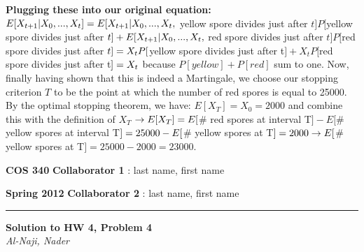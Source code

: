 \documentclass[12pt]{article}
\newcommand{\myheader}[4]
{\vspace*{-0.5in}
\noindent
{#1} \hfill {#3}

\noindent
{#2} \hfill {#4}

\noindent
\rule[8pt]{\textwidth}{1pt}

\vspace{1ex} 
}  %
\newcommand{\myalgsheader}[0]
{\myheader
{ {\bf{COS 340}} }
{ {\bf{Spring 2012}} }
{ {\bf{Collaborator 1}} : last name, first name }
{ {\bf{Collaborator 2}} : last name, first name}
}
\newcommand{\myhwtitle}[3]
{\begin{center}
{\large {\bf Solution to HW {#1}, Problem {#2}}}\\
\medskip 
{\it {#3}} %
\end{center}}
\begin{document}
\newline
\newline
\textbf{Plugging these into our original equation: }
\newline
$E[X_{t+1} | X_0, ..., X_t] 
\newline = E[X_{t+1} | X_0, ..., X_t,$ yellow spore divides just after $t] P[$yellow spore divides just after $t]
\newline + E[X_{t+1} | X_0, ..., X_t,$ red spore divides just after $t] P[$red spore divides just after $t]
\newline
\newline
= X_t P[$yellow spore divides just after t$] + X_t P[$red spore divides just after t$]
\newline
= X_t$ because $P[yellow] + P[red]$ sum to one.
\newline
\newline
Now, finally having shown that this is indeed a Martingale, we choose our stopping criterion $T$ to be the point at which 
the number of red spores is equal to 25000. By the optimal stopping theorem, we have:
\newline
\newline
$E[X_T] = X_0 = 2000$ and combine this with the definition of $X_T$$
\newline
\rightarrow E[X_T] = E[$\# red spores at interval T$] - E[$\# yellow spores at interval T$]
\newline = 25000 - E[$\# yellow spores at T$] = 2000 
\newline \rightarrow E[$\# yellow spores at T$] = 25000 - 2000 = 23000$.


\pagebreak

\myalgsheader

\pagestyle{plain}

\myhwtitle{4}{4}{Al-Naji, Nader}

\bigskip
\end{document}
